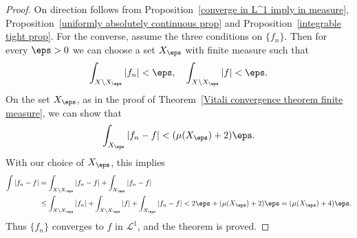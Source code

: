 \begin{proof}
On direction follows from Proposition~\ref{converge in L^1 imply in measure}, Proposition~\ref{uniformly absolutely continuous prop} and Proposition~\ref{integrable tight prop}. For the converse, assume the three conditions on $\{f_n\}$. Then for every $\eps>0$ we can choose a set $X_\eps$ with finite measure such that 
\[\int_{X\setminus X_\eps}|f_n|<\eps,\quad\int_{X\setminus X_\eps}|f|<\eps.\]
On the set $X_\eps$, as in the proof of Theorem~\ref{Vitali convergence theorem finite measure}, we can show that
\[\int_{X_\eps}|f_n-f|<(\mu(X_\eps)+2)\eps.\]
With our choice of $X_\eps$, this implies
\begin{align*}
\int|f_n-f|&=\int_{X\setminus X_\eps}|f_n-f|+\int_{X_\eps}|f_n-f|\\
&\leq\int_{X\setminus X_\eps}|f_n|+\int_{X\setminus X_\eps}|f|+\int_{X_\eps}|f_n-f|<2\eps+(\mu(X_\eps)+2)\eps=(\mu(X_\eps)+4)\eps.
\end{align*}
Thus $\{f_n\}$ converges to $f$ in $\mathcal{L}^1$, and the theorem is proved.
\end{proof}
